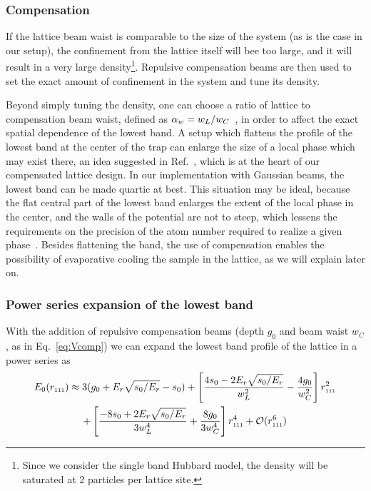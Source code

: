 \subsubsection{Compensation}
\label{subsec:compensation}

If the lattice beam waist is comparable to the size of the system (as is the
case in our setup),  the confinement from the lattice itself will bee too
large, and it will result in a very large density\footnote{Since we consider
the single band Hubbard model, the density will be saturated at 2 particles per
lattice site.}.  Repulsive compensation beams are then used  to set the
exact amount of confinement in the system and tune its density. 

Beyond simply tuning the density, one can choose a ratio of lattice to
compensation beam waist, defined as $ \alpha_{w}  = w_{L}/w_{C}$~\cite{Mathy2012},
in order to affect the exact spatial dependence of the lowest band.   A setup
which flattens the profile of the lowest band at the center of the trap can
enlarge the size of a local phase which may exist there, an idea suggested in
Ref.~\cite{Mathy2012}, which is at the heart of our compensated lattice design.
In our implementation with Gaussian beams, the lowest band can be made quartic
at best.  This situation may be ideal, because the flat central part of the
lowest band enlarges the extent of the local phase in the center, and the walls
of the potential are not to steep, which lessens the requirements on the
precision of the atom number required to realize a given phase~\cite{Ma2008}.
Besides flattening the band, the use of compensation enables the possibility of
evaporative cooling the sample in the lattice, as we will explain later on.  


\subsubsection{Power series expansion of the lowest band} With the addition of
repulsive compensation beams (depth $g_{0}$ and beam waist $w_{C}$, as in
Eq.~\ref{eq:Vcomp})  we can expand the lowest band profile of the lattice in a
power series as  
\begin{multline} 
  E_{0}( r_{\text{\tiny{111}}} )    \approx   
  3( g_{0} + E_{r}\sqrt{s_{0}/E_{r}} - s_{0} )   
  + \left[ 
    \frac{ 4s_{0} - 2E_{r}\sqrt{s_{0}/E_{r}} }{w_{L}^{2} } 
   - 
  \frac{ 4 g_{0} }{ w_{C}^{2}} \right]
   r_{\text{\tiny{111}}} ^{2}  \\ 
  +  \left[  \frac{ - 8 s_{0} + 2E_{r}\sqrt{s_{0}/E_{r}} }{3 w_{L}^{4} } + 
    \frac{ 8 g_{0} }{3 w_{C}^{4} }  \right]  r_{\text{\tiny{111}}} ^{4}   + 
  \mathcal{O}(  r_{\text{\tiny{111}}} ^{6} )
\label{eq:series_expansion} 
\end{multline}  

